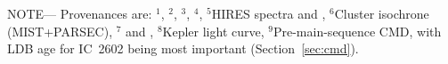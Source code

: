 \begin{table*}
\begin{tabular}{llcc}
\hline
\end{tabular}
\begin{flushleft}
 \footnotesize{ \textsc{NOTE}---
Provenances are:
$^1$\citet{gaia_collaboration_gaia_2018},
$^2$\citet{stassun_TIC8_2019},
$^3$\citet{skrutskie_tmass_2006},
$^4$\citet{Lindegren_2021_offset},
$^5$HIRES spectra and \citet{yee_SM_2017},
$^6$Cluster isochrone (MIST+PARSEC),
$^7$\citet{capitanio_threedimensional_2017} and \citet{lallement_threedimensional_2018},
$^8$Kepler light curve,
$^9$Pre-main-sequence CMD, with LDB age for IC~2602 being most
important (Section~\ref{sec:cmd}).
}
\end{flushleft}
\vspace{-0.5cm}
\end{table*}
